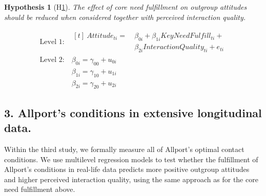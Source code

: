 \documentclass[man, 12pt, a4paper, mask]{apa7}
\theoremstyle{break}
\theoremstyle{plain}
\newtheorem{subhyp}{Hypothesis}
\begin{document}
\begin{mdframed}[style=mdfhypothesis]
    \begin{subhyp}[H\ref{hyp:keyNeedMediation}] \label{hyp:keyNeedMediation}
    \addtolength{\leftskip}{\subhypskip}
    The effect of core need fulfillment on outgroup attitudes should be reduced when considered together with perceived interaction quality.
    \end{subhyp}
    
    \begin{fleqn}[\eqskip]
      \begin{equation} \label{eq:SlopesAttCoreQual}
        \begin{split}
          \textrm{Level 1:} &
            \begin{aligned}[t]
              \ Attitude_{ti} =  &\ \beta_{0i} + \beta_{1i}KeyNeedFulfill_{ti} + \\
                                 &\ \beta_{2i}InteractionQuality_{ti} + e_{ti}
            \end{aligned} \\
          \textrm{Level 2:} &\ \beta_{0i} = \gamma_{00} + u_{0i} \\
                            &\ \beta_{1i} = \gamma_{10} + u_{1i} \\
                            &\ \beta_{2i} = \gamma_{20} + u_{2i}
        \end{split} 
      \end{equation}
    \end{fleqn}
\end{mdframed}

\subsection{3. Allport's conditions in extensive longitudinal data.}
Within the third study, we formally measure all of Allport's optimal contact conditions. We use multilevel regression models to test whether the fulfillment of Allport's conditions in real-life data predicts more positive outgroup attitudes and higher perceived interaction quality, using the same approach as for the core need fulfillment above.
\end{document}
